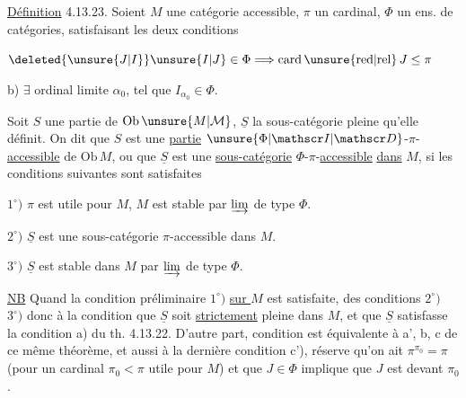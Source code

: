 
\uline{Définition} 4.13.23. Soient $M$ une catégorie accessible, $\pi$  un cardinal, $\Phi$ un ens. de catégories, satisfaisant les deux conditions

 $\deleted{\unsure{J|I}}\unsure{I|J}\in\Phi\Longrightarrow\mathrm{card}\,\unsure{\mathrm{red}|\mathrm{rel}}\,J\leq\pi$

b) $\exists$ ordinal limite $\alpha_0$, tel que $I_{\alpha_0}\in\Phi$.




Soit $S$ une partie de $\mathrm{Ob}\,\unsure{M|\mathcal M}$, $\underline S$ la sous-catégorie pleine qu'elle définit. On dit que $S$ est une \uline{partie} $\unsure{\Phi|\mathscr I|\mathscr D}$-$\pi$-\uline{accessible} de $\mathrm{Ob}\,M$, ou que $\underline S$ est une \uline{sous-catégorie} $\Phi$-$\pi$-\uline{accessible} \uline{dans} $M$, si \unsure{,} les conditions suivantes sont satisfaites


$1^\circ)$ $\pi$ est utile pour $M$, $M$ est stable par $\varinjlim$ de type $\Phi$.

$2^\circ)$ $\underline S$ est une sous-catégorie $\pi$-accessible \unsure{:} dans $M$.

$3^\circ)$ $\underline S$ est  stable dans $M$ par $\varinjlim$ de type $\Phi$.


\uline{NB} Quand la condition préliminaire $1^\circ)$ \uline{sur $M$} est satisfaite,  des conditions $2^\circ)$ $3^\circ)$  donc à la condition que $\underline S$ soit \uline{strictement} pleine dans $M$, et que  $\underline S$ satisfasse la condition a) du th. 4.13.22. D'autre part,  condition est équivalente à    a', b, c de ce même théorème, et aussi à la dernière condition c'),  réserve qu'on ait $\pi^{\pi_0}=\pi$ (pour un cardinal $\pi_0<\pi$ utile pour $M$) et que $J\in\Phi$ implique que $J$ est  devant $\pi_0$.

